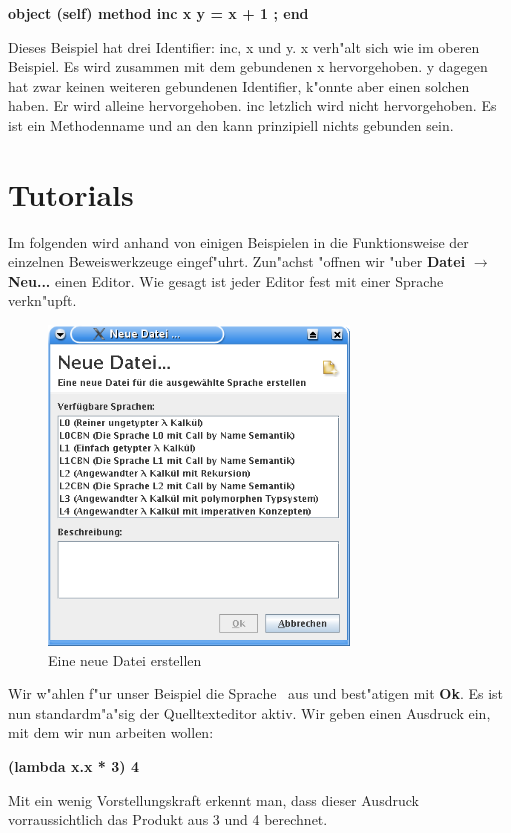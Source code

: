 {\bf object (self) method inc x y = x + 1 ; end}

Dieses Beispiel hat drei Identifier: inc, x und y. x verh"alt sich wie im oberen Beispiel. Es wird zusammen mit dem gebundenen x hervorgehoben. y dagegen hat zwar keinen weiteren gebundenen Identifier, k"onnte aber einen solchen haben. Er wird alleine hervorgehoben. inc letzlich wird nicht hervorgehoben. Es ist ein Methodenname und an den kann prinzipiell nichts gebunden sein.

\section {Tutorials}
Im folgenden wird anhand von einigen Beispielen in die
Funktionsweise der einzelnen Beweiswerkzeuge eingef"uhrt. Zun"achst
"offnen wir "uber {\bf Datei} $\rightarrow$ {\bf Neu...} einen
Editor. Wie gesagt ist jeder Editor fest mit einer Sprache
verkn"upft.

\begin{figure}[h]
\begin{center}
\includegraphics[width=8cm]{images/new-dialog.png}
\caption{Eine neue Datei erstellen}
\end{center}
\end{figure}

Wir w"ahlen f"ur unser Beispiel die Sprache \LONE\ aus und best"atigen
mit {\bf Ok}. Es ist nun standardm"a"sig der Quelltexteditor aktiv.
Wir geben einen Ausdruck ein, mit dem wir nun arbeiten wollen:

{\bf (lambda x.x * 3) 4}

Mit ein wenig Vorstellungskraft erkennt man, dass dieser Ausdruck
vorraussichtlich das Produkt aus 3 und 4 berechnet.


